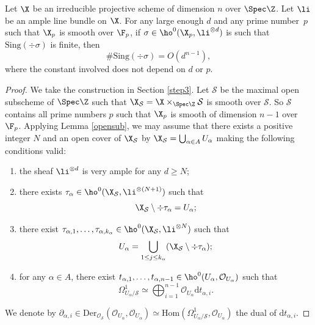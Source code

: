 
\begin{lem}\label{singnum}
Let $\X$ be an irreducible projective scheme of dimension $n$ over $\Spec \Z$. Let $\li$ be an ample line bundle on $\X$. For any large enough $d$ and any prime number~$p$ such that $\X_p$ is smooth over $\F_p$, if $\sigma\in \ho^0(\X_p, \li^{\otimes d})$ is such that $\mathrm{Sing}(\div \sigma)$ is finite, then
\[
\#\mathrm{Sing}(\div \sigma)=O(d^{n-1}),
\]
where the constant involved does not depend on $d$ or $p$.
\end{lem}

\begin{proof}
We take the construction in Section \ref{step3}. Let $\mathcal{S}$ be the maximal open subscheme of $\Spec \Z$ such that $\X_{\mathcal{S}}=\X\times_{\Spec \Z}\mathcal{S}$ is smooth over $\mathcal{S}$. So $\mathcal{S}$ contains all prime numbers $p$ such that $\X_p$ is smooth of dimension $n-1$ over $\F_p$. Applying Lemma \ref{opensub}, we may assume that there exists a positive integer $N$ and an open cover of $\X_{\mathcal{S}}$ by $\X_{\mathcal{S}}=\bigcup_{ \alpha\in A}U_{\alpha}$ making the following conditions valid:
\begin{enumerate}
\item the sheaf $\li^{\otimes d}$ is very ample for any $d\geq N$;
\item there exists $\tau_{\alpha}\in \ho^0(\X_{\mathcal{S}}, \li^{\otimes (N+1)})$ such that
\[
\X_{\mathcal{S}}\setminus\div \tau_{\alpha}=U_{\alpha};
\]
\item there exist $\tau_{\alpha,1},\dots, \tau_{\alpha,k_{\alpha}}\in \ho^0(\X_{\mathcal{S}}, \li^{\otimes N})$ such that
\[
U_{\alpha}=\bigcup_{1\leq j\leq k_{\alpha}}(\X_{\mathcal{S}}\setminus \div \tau_{\alpha});
\]
\item for any $\alpha\in A$, there exist $t_{\alpha, 1},\dots,t_{\alpha, n-1}\in \ho^0(U_{\alpha}, \mathcal{O}_{U_{\alpha}})$ such that
\[
\Omega^1_{U_{\alpha}/\mathcal{S}}\simeq \bigoplus_{i=1}^{n-1}\mathcal{O}_{U_{\alpha}}\mathrm{d}t_{\alpha,i}.
\]
\end{enumerate}
We denote by $\partial_{\alpha,i}\in \mathrm{Der}_{\mathcal{O}_{\mathcal{S}}}(\mathcal{O}_{U_{\alpha}},\mathcal{O}_{U_{\alpha}})\simeq \mathrm{Hom}(\Omega^1_{U_{\alpha}/\mathcal{S}}, \mathcal{O}_{U_{\alpha}})$ the dual of $\mathrm{d}t_{\alpha, i}$.


\end{proof}
